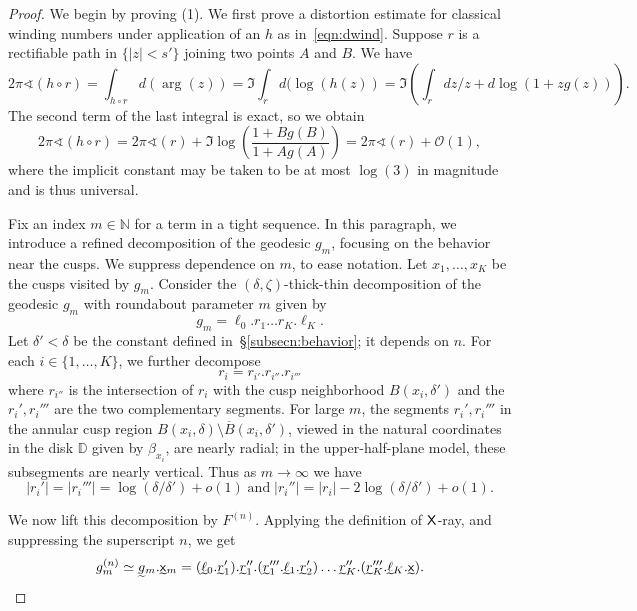 \documentclass{amsart}
\newcommand\ID{{\mathbb{D}}}
\newcommand\N{{\mathbb{N}}}
\theoremstyle{definition}
\theoremstyle{remark}
\newcommand{\sfX}{{\sf X}}
\newcommand{\sfx}{{\sf x}}
\begin{document}
\begin{proof} We begin by proving (1).  We first prove a distortion estimate for classical winding numbers under application of an $h$ as in~\eqref{eqn:dwind}.  Suppose $r$ is a rectifiable path in $\{|z|<s'\}$ joining two points $A$ and $B$. We have 
\[ 2\pi \sphericalangle(h\circ r) =\int_{h\circ r}d(\arg(z)) =\Im\int_r d(\log(h(z))=\Im\left(\int_r dz/z + d\log(1+zg(z))\right).\]
The second term of the last integral is exact, so we obtain 
\begin{equation}\label{eq:univwind}
2\pi\sphericalangle(h\circ r)=2\pi\sphericalangle(r)+\Im\log\left(\frac{1+Bg(B)}{1+Ag(A)}\right)=2\pi\sphericalangle(r)+\mathcal O(1),
\end{equation}
where the implicit constant may be taken to be at most $\log(3)$ in magnitude and is thus universal.  

Fix an index $m \in \N$ for a term in a tight sequence. In this paragraph, we introduce a refined decomposition of the geodesic $g_m$, focusing on the behavior near the cusps.   
We suppress dependence on $m$, to ease notation.  Let $x_1, \ldots, x_K$ be the cusps visited by $g_m$. 
Consider the $(\delta,\zeta)$-thick-thin decomposition of the geodesic $g_m$ with roundabout parameter $m$ given by 
\[ g_m=\ell_{0}.r_{1}\ldots r_{K} . \ell_{K}.\]
Let $\delta'<\delta$ be the constant defined in~\S\ref{subsecn:behavior}; it depends on $n$.
For each $i\in \{1, \ldots, K\}$, we further decompose 
\[ r_{i} = r_{i'} . r_{i''} . r_{i'''}\]
where $r_{i''}$ is the intersection of $r_{i}$ with the cusp neighborhood $B(x_i,\delta')$ and the $r_i', r_i'''$ are the two complementary segments.  For large $m$, the segments $r_i', r_i'''$ in the annular cusp region $B(x_i, \delta) \setminus \overline{B}(x_i,\delta')$, viewed in the natural coordinates in the disk $\ID$ given by $\beta_{x_i}$, are nearly radial; in the upper-half-plane model, these subsegments are nearly vertical. Thus as $m\to\infty$ we have 
\begin{equation}\label{eqn:rprimes}
 |r_i'|=|r_i'''|=\log(\delta/\delta')+o(1)\; \text{and} \; |r_i''|=|r_i|-2\log(\delta/\delta')+o(1).
 \end{equation}
 
 We now lift this decomposition by $F^{(n)}$.  Applying the definition of $\sfX$-ray, and suppressing the superscript $n$, we get  
\[g_m^{(n)} \simeq\undertilde{g}_m.\undertilde{\sfx}_m = (\undertilde{\ell}_{0} .\undertilde{r}_1').\undertilde{r}_{1}''.(\undertilde{r}_1'''.\undertilde{\ell}_1.\undertilde{r}_2') \ldots \undertilde{r}_{K}'' . (\undertilde{r}_K'''.\undertilde{\ell}_{K}.\undertilde{\sfx}).\]


\end{proof}
\end{document}
